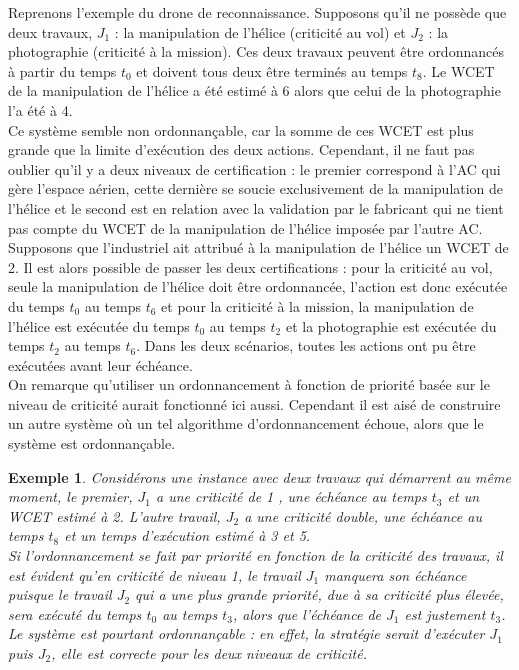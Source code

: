 \documentclass[12pt,a4paper,oneside]{book}
\theoremstyle{break}
\newtheorem{exem}{Exemple}[chapter]
\theoremstyle{breakplain}
\begin{document}
Reprenons l'exemple du drone de reconnaissance. Supposons qu'il ne possède que deux travaux, $J_1$ : la manipulation de l'hélice (criticité au vol) et  $J_2$ : la photographie (criticité à la mission). Ces deux travaux peuvent être ordonnancés à partir du temps $t_0$ et doivent tous deux être terminés au temps $t_8$. Le WCET de la manipulation de l'hélice a été estimé à 6 alors que celui de la photographie l'a été à 4.\\

Ce système semble non ordonnançable, car la somme de ces WCET est plus grande que la limite d'exécution des deux actions. Cependant, il ne faut pas oublier qu'il y a deux niveaux de certification : le premier correspond à l'AC qui gère l'espace aérien, cette dernière se soucie exclusivement de la manipulation de l'hélice et le second est en relation avec la validation par le fabricant qui ne tient pas compte du WCET de la manipulation de l'hélice imposée par l'autre AC.\\

Supposons que l'industriel ait attribué à la manipulation de l'hélice un WCET de 2. Il est alors possible de passer les deux certifications : pour la criticité au vol, seule la manipulation de l'hélice doit être ordonnancée, l'action est donc exécutée du temps $t_0$ au temps $t_6$ et pour la criticité à la mission, la manipulation de l'hélice est exécutée du temps $t_0$ au temps $t_2$ et la photographie est exécutée du temps $t_2$ au temps $t_6$. Dans les deux scénarios, toutes les actions ont pu être exécutées avant leur échéance.\\

On remarque qu'utiliser un ordonnancement à fonction de priorité basée sur le niveau de criticité aurait fonctionné ici aussi. Cependant il est aisé de construire un autre système où un tel algorithme d'ordonnancement échoue, alors que le système est ordonnançable.\\

\pagebreak

\begin{exem}
Considérons une instance avec deux travaux qui démarrent au même moment, le premier, $J_1$ a une criticité de 1 , une échéance au temps $t_3$ et un WCET estimé à 2. L'autre travail, $J_2$ a une criticité double, une échéance au temps $t_8$ et un temps d'exécution estimé à 3 et 5.\\

Si l'ordonnancement se fait par priorité en fonction de la criticité des travaux, il est évident qu'en criticité de niveau 1, le travail $J_1$ manquera son échéance puisque le travail $J_2$ qui a une plus grande priorité, due à sa criticité plus élevée, sera exécuté du temps $t_0$ au temps $t_3$, alors que l'échéance de $J_1$ est justement $t_3$.\\
Le système est pourtant ordonnançable : en effet, la stratégie serait d'exécuter $J_1$ puis $J_2$, elle est correcte pour les deux niveaux de criticité.
\end{exem}
\end{document}
